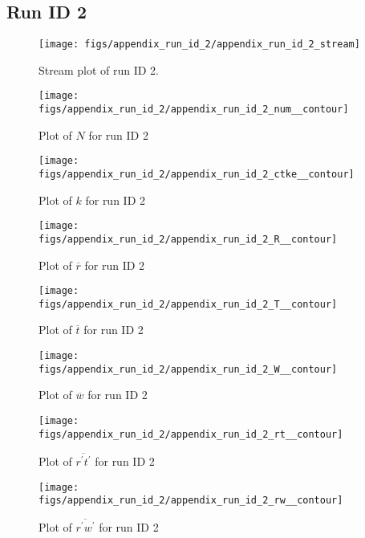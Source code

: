 \subsection{Run ID 2}
\begin{figure}[H]
\centering
\texttt{[image: figs/appendix\_run\_id\_2/appendix\_run\_id\_2\_stream]}
\caption{Stream plot of run ID 2.}
\label{fig:appendix_run_id_2_stream}
\end{figure}


\begin{figure}[H]
\centering
\texttt{[image: figs/appendix\_run\_id\_2/appendix\_run\_id\_2\_num\_\_contour]}
\caption{Plot of $N$ for run ID 2}
\label{fig:appendix_run_id_2_num__contour}
\end{figure}


\begin{figure}[H]
\centering
\texttt{[image: figs/appendix\_run\_id\_2/appendix\_run\_id\_2\_ctke\_\_contour]}
\caption{Plot of $k$ for run ID 2}
\label{fig:appendix_run_id_2_ctke__contour}
\end{figure}


\begin{figure}[H]
\centering
\texttt{[image: figs/appendix\_run\_id\_2/appendix\_run\_id\_2\_R\_\_contour]}
\caption{Plot of $\overline{r}$ for run ID 2}
\label{fig:appendix_run_id_2_R__contour}
\end{figure}


\begin{figure}[H]
\centering
\texttt{[image: figs/appendix\_run\_id\_2/appendix\_run\_id\_2\_T\_\_contour]}
\caption{Plot of $\overline{t}$ for run ID 2}
\label{fig:appendix_run_id_2_T__contour}
\end{figure}


\begin{figure}[H]
\centering
\texttt{[image: figs/appendix\_run\_id\_2/appendix\_run\_id\_2\_W\_\_contour]}
\caption{Plot of $\overline{w}$ for run ID 2}
\label{fig:appendix_run_id_2_W__contour}
\end{figure}


\begin{figure}[H]
\centering
\texttt{[image: figs/appendix\_run\_id\_2/appendix\_run\_id\_2\_rt\_\_contour]}
\caption{Plot of $\overline{r^\prime t^\prime}$ for run ID 2}
\label{fig:appendix_run_id_2_rt__contour}
\end{figure}


\begin{figure}[H]
\centering
\texttt{[image: figs/appendix\_run\_id\_2/appendix\_run\_id\_2\_rw\_\_contour]}
\caption{Plot of $\overline{r^\prime w^\prime}$ for run ID 2}
\label{fig:appendix_run_id_2_rw__contour}
\end{figure}


